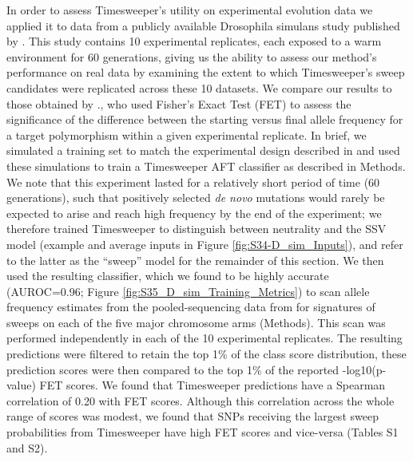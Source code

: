 In order to assess Timesweeper’s utility on experimental evolution data we applied it to data from a publicly available Drosophila simulans study published by \cite{barghiGeneticRedundancyFuels2019}. This study contains 10 experimental replicates, each exposed to a warm environment for 60 generations, giving us the ability to assess our method’s performance on real data by examining the extent to which Timesweeper’s sweep candidates were replicated across these 10 datasets. We compare our results to those obtained by \cite{barghiGeneticRedundancyFuels2019}., who used Fisher’s Exact Test (FET) to assess the significance of the difference between the starting versus final allele frequency for a target polymorphism within a given experimental replicate. 
In brief, we simulated a training set to match the experimental design described in \cite{barghiGeneticRedundancyFuels2019} and used these simulations to train a Timesweeper AFT classifier as described in Methods. We note that this experiment lasted for a relatively short period of time (60 generations), such that positively selected \textit{de novo} mutations would rarely be expected to arise and reach high frequency by the end of the experiment; we therefore trained Timesweeper to distinguish between neutrality and the SSV model (example and average inputs in Figure \ref{fig:S34-D_sim_Inputs}), and refer to the latter as the “sweep” model for the remainder of this section. We then used the resulting classifier, which we found to be highly accurate (AUROC=0.96; Figure \ref{fig:S35_D_sim_Training_Metrics}) to scan allele frequency estimates from the pooled-sequencing data from \cite{barghiGeneticRedundancyFuels2019} for signatures of sweeps on each of the five major chromosome arms (Methods). This scan was performed independently in each of the 10 experimental replicates. The resulting predictions were filtered to retain the top 1\% of the class score distribution, these prediction scores were then compared to the top 1\% of the reported -log10(p-value) FET scores. We found that Timesweeper predictions have a Spearman correlation of 0.20 with FET scores. Although this correlation across the whole range of scores was modest, we found that SNPs receiving the largest sweep probabilities from Timesweeper have high FET scores and vice-versa (Tables S1 and S2).

